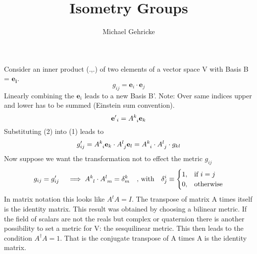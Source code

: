 \documentclass[11pt, oneside]{article}   	%
\title{Isometry Groups}
\author{Michael Gehricke}
\begin{document}
\maketitle
\newcommand{\vect}[1]{\mathbf{#1}}
\newcommand{\tenmix}[3]{{#1}^{#2}_{#3}}


\section{}
\subsection{}
Consider an inner product (.,.) of two elements of a vector space V with Basis B = $\vect{e_{i}}$. \\
\begin{equation}
g_{ij} = \vect{e}_{i} \cdot \vect{e}_{j}
\end{equation}
%
Linearly combining the $\vect{e}_{i}$ leads to a new Basis B'. Note: Over same indices upper and lower has to be summed (Einstein sum convention).
\begin{equation}
	\vect{e'}_{i} = A\indices{^k_i} \vect{e}_{k}	
\end{equation}
%
Substituting (2) into (1) leads to
\begin{equation}
	g_{ij}' = A\indices{^k_i} \vect{e}_{k} \cdot A\indices{^l_j} \vect{e}_{l} = A\indices{^k_i} \cdot A\indices{^l_j} \cdot g_{kl}
\end{equation}
%
Now suppose we want the transformation not to effect the metric $g_{ij}$ 
\begin{equation}
	g_{ij} = g'_{ij} \quad \implies A\indices{^k_l} \cdot A\indices{^l_m} = \delta^k_m \quad \text{, with} \quad \delta^i_j \equiv
	\begin{cases}
		1, & \text{if $i=j$}\\
        0, & \text{otherwise}
	\end{cases}
\end{equation}
%
In matrix notation this looks like $A^tA = I$. The transpose of matrix A times itself is the identity matrix. This result was obtained by choosing a bilinear metric. If the field of scalars are not the reals but complex or quaternion there is another possibility to set a metric for V: the sesquilinear metric. This then leads to the condition $A^\dagger A = 1$. That is the conjugate transpose of A times A is the identity matrix.
%
\end{document}

